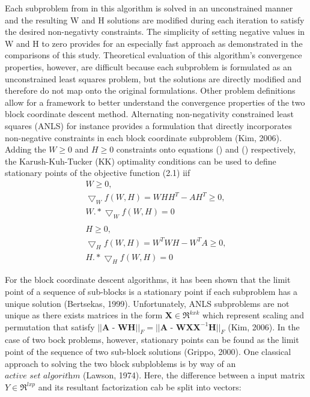 \documentclass[final,leqno,onefignum,onetabnum]{siamltex1213}
\begin{document}
Each subproblem from in this algorithm is solved in an unconstrained manner and the resulting W and H solutions are modified during each iteration to satisfy the desired non-negativty constraints. The simplicity of setting negative values in W and H to zero provides for an especially fast approach as demonstrated in the comparisons of this study. Theoretical evaluation of this algorithm's convergence properties, however, are difficult because each subproblem is formulated as an unconstrained least squares problem, but the solutions are directly modified and therefore do not map onto the original formulations. Other problem definitions allow for a framework to better understand the convergence properties of the two block coordinate descent method. Alternating non-negativity constrained least squares (ANLS) for instance provides a formulation that directly incorporates non-negative constraints in each block coordinate subproblem (Kim, 2006). Adding the $W \ge 0$ and  $ H \ge 0 $ constraints onto equations () and () respectively, the Karush-Kuh-Tucker (KK) optimality conditions can be used to define stationary points of the objective function (2.1) iif
\begin{equation}\label{EKx}
\begin{align} 
  W \ge 0,\\
  \bigtriangledown_W f(W,H)  = WHH^T - AH^T \ge 0,\\
  W.* \bigtriangledown_Wf(W,H) = 0\\ \\
    H \ge 0,\\ 
  \bigtriangledown_H f(W,H)  = W^T WH - W^T A \ge 0,\\
  H.* \bigtriangledown_Hf(W,H) = 0  
  \end{align}
\end{equation}

For the block coordinate descent algorithms, it has been shown that the limit point of a sequence of sub-blocks is a stationary point if each subproblem has a unique solution (Bertsekas, 1999). Unfortunately, ANLS subproblems are not unique as there exists matrices in the form $ \textbf{X} \in \Re^{kxk} $ which represent scaling and permutation that satisfy $ || \textbf{A - WH} ||_{F} = || \textbf{A - WXX}^{-1} \textbf{H} ||_{F} $ (Kim, 2006).  In the case of two bock problems, however, stationary points can be found as the limit point of the sequence of two sub-block solutions (Grippo, 2000). One classical approach to solving the two block subploblems is by way of an $\textit{active set algorithm}$ (Lawson, 1974). Here, the difference between a input matrix $ Y \in \Re^{lxp}$  and its resultant factorization cab be split into vectors:
\end{document}
